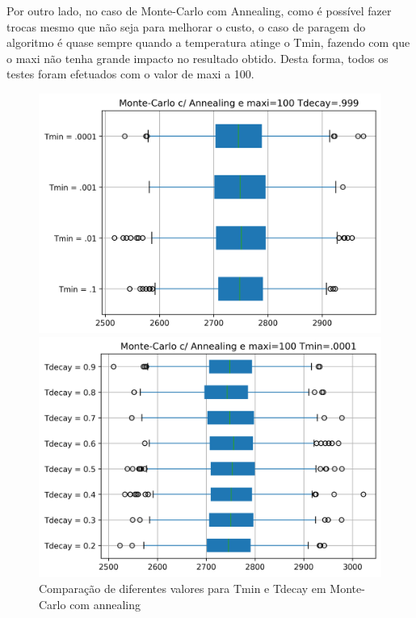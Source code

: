 \documentclass[a4paper]{report}
\begin{document}
Por outro lado, no caso de Monte-Carlo com Annealing, como é possível fazer
trocas mesmo que não seja para melhorar o custo, o caso de paragem do algoritmo
é quase sempre quando a temperatura atinge o Tmin, fazendo com que o maxi não
tenha grande impacto no resultado obtido. Desta forma, todos os testes foram
efetuados com o valor de maxi a 100.

\begin{figure}[h]
\centering
\begin{minipage}{.5\textwidth}
  \centering
  \includegraphics[width=.95\linewidth]{images/graph_comp_tmin_sa.png}
\end{minipage}%
\begin{minipage}{.5\textwidth}
  \centering
  \includegraphics[width=.95\linewidth]{images/graph_comp_tdecay_sa.png}
\end{minipage}
    \caption{Comparação de diferentes valores para Tmin e Tdecay em Monte-Carlo com annealing}
\end{figure}
\end{document}
